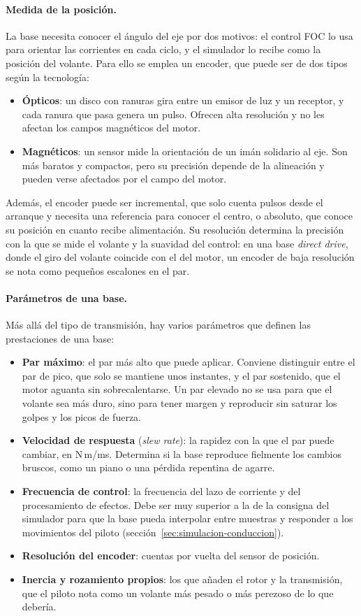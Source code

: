 \paragraph{Medida de la posición.}
La base necesita conocer el ángulo del eje por dos motivos: el control FOC lo usa para orientar las corrientes en cada ciclo, y el simulador lo recibe como la posición del volante. Para ello se emplea un encoder, que puede ser de dos tipos según la tecnología:
\begin{itemize}
	\item \textbf{Ópticos}: un disco con ranuras gira entre un emisor de luz y un receptor, y cada ranura que pasa genera un pulso. Ofrecen alta resolución y no les afectan los campos magnéticos del motor.
	\item \textbf{Magnéticos}: un sensor mide la orientación de un imán solidario al eje. Son más baratos y compactos, pero su precisión depende de la alineación y pueden verse afectados por el campo del motor.
\end{itemize}
Además, el encoder puede ser incremental, que solo cuenta pulsos desde el arranque y necesita una referencia para conocer el centro, o absoluto, que conoce su posición en cuanto recibe alimentación. Su resolución determina la precisión con la que se mide el volante y la suavidad del control: en una base \textit{direct drive}, donde el giro del volante coincide con el del motor, un encoder de baja resolución se nota como pequeños escalones en el par.

\paragraph{Parámetros de una base.}
Más allá del tipo de transmisión, hay varios parámetros que definen las prestaciones de una base:
\begin{itemize}
	\item \textbf{Par máximo}: el par más alto que puede aplicar. Conviene distinguir entre el par de pico, que solo se mantiene unos instantes, y el par sostenido, que el motor aguanta sin sobrecalentarse. Un par elevado no se usa para que el volante sea más duro, sino para tener margen y reproducir sin saturar los golpes y los picos de fuerza.
	\item \textbf{Velocidad de respuesta} (\textit{slew rate}): la rapidez con la que el par puede cambiar, en N\,m/ms. Determina si la base reproduce fielmente los cambios bruscos, como un piano o una pérdida repentina de agarre.
	\item \textbf{Frecuencia de control}: la frecuencia del lazo de corriente y del procesamiento de efectos. Debe ser muy superior a la de la consigna del simulador para que la base pueda interpolar entre muestras y responder a los movimientos del piloto (sección~\ref{sec:simulacion-conduccion}).
	\item \textbf{Resolución del encoder}: cuentas por vuelta del sensor de posición.
	\item \textbf{Inercia y rozamiento propios}: los que añaden el rotor y la transmisión, que el piloto nota como un volante más pesado o más perezoso de lo que debería.
\end{itemize}

